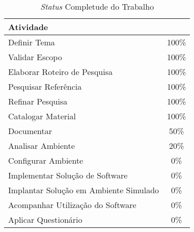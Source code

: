 \begin{table}[h!]
\centering
\caption{\textit{Status} Completude do Trabalho}
\label{table_status}
\begin{tabular}{lc}
\rowcolor[HTML]{9A0000} 
{\color[HTML]{FFFFFF} \textbf{Atividade}} & \multicolumn{1}{l}{\cellcolor[HTML]{9A0000}{\color[HTML]{FFFFFF} \textbf{Status}}} \\ \hline
Definir Tema                              & 100\%                                                                              \\ \hline
Validar Escopo                            & 100\%                                                                              \\ \hline
Elaborar Roteiro de Pesquisa              & 100\%                                                                              \\ \hline
Pesquisar Referência                      & 100\%                                                                              \\ \hline
Refinar Pesquisa                          & 100\%                                                                              \\ \hline
Catalogar Material                        & 100\%                                                                              \\ \hline
Documentar                                & 50\%                                                                               \\ \hline
Analisar Ambiente                         & 20\%                                                                               \\ \hline
Configurar Ambiente                       & 0\%                                                                                \\ \hline
Implementar Solução de Software           & 0\%                                                                                \\ \hline
Implantar Solução em Ambiente Simulado    & 0\%                                                                                \\ \hline
Acompanhar Utilização do Software         & 0\%                                                                                \\ \hline
Aplicar Questionário                      & 0\%                                                                                \\ \hline
\end{tabular}
\end{table}


